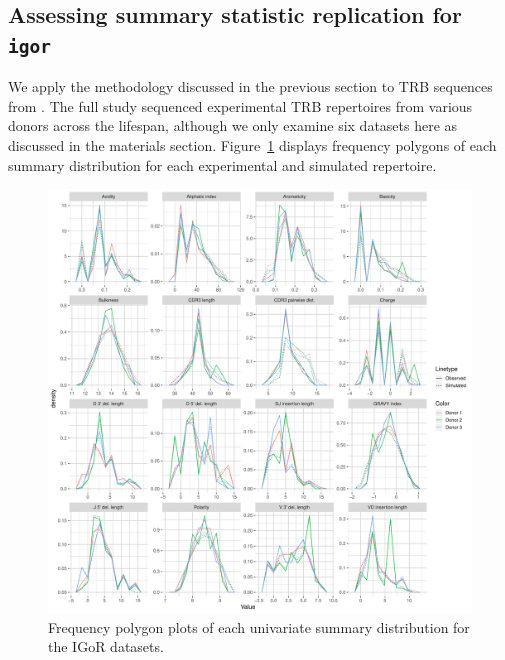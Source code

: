 \documentclass{article}
\begin{document}
\subsection*{Assessing summary statistic replication for \texttt{igor}}
We apply the methodology discussed in the previous section to TRB sequences from \cite{Britanova2016-iw}.
The full study sequenced experimental TRB repertoires from various donors across the lifespan, although we only examine six datasets here as discussed in the materials section.
Figure~\ref{fig:IgorFreqPolys} displays frequency polygons of each summary distribution for each experimental and simulated repertoire.
\begin{figure}
    \includegraphics[width=\linewidth]{Figures/IgorScores/igor_freqpoly.pdf}
    \caption{Frequency polygon plots of each univariate summary distribution for the IGoR datasets.}
    \label{fig:IgorFreqPolys}
\end{figure}
\end{document}

